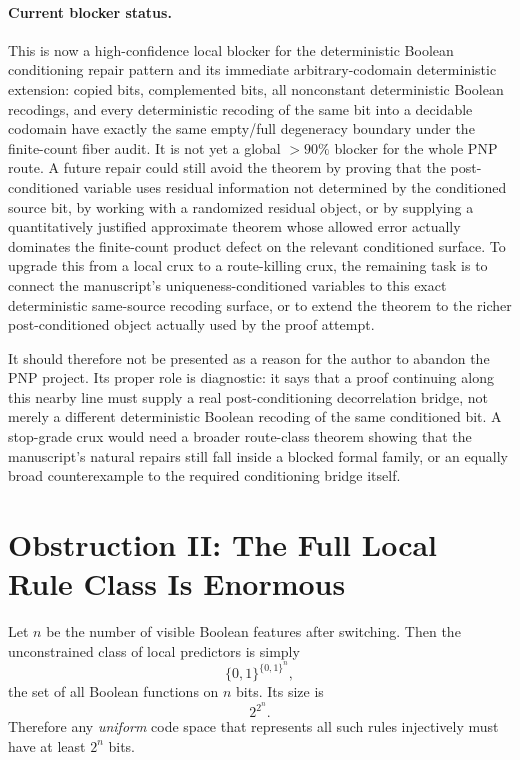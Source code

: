 \documentclass[11pt]{article}
\theoremstyle{remark}
\begin{document}
\paragraph{Current blocker status.}
This is now a high-confidence local blocker for the deterministic Boolean
conditioning repair pattern and its immediate arbitrary-codomain deterministic
extension: copied bits, complemented bits, all nonconstant deterministic Boolean
recodings, and every deterministic recoding of the same bit into a decidable
codomain have exactly the same empty/full degeneracy boundary under the
finite-count fiber audit.  It is not yet a global \(>90\%\) blocker for the
whole PNP route.  A future repair could still avoid the theorem by proving that
the post-conditioned variable uses residual information not determined by the
conditioned source bit, by working with a randomized residual object, or by
supplying a quantitatively justified approximate theorem whose allowed error
actually dominates the finite-count product defect on the relevant conditioned
surface.
To upgrade this from a local crux to a route-killing crux, the remaining task is
to connect the manuscript's uniqueness-conditioned variables to this exact
deterministic same-source recoding surface, or to extend the theorem to the
richer post-conditioned object actually used by the proof attempt.

It should therefore not be presented as a reason for the author to abandon the
PNP project.  Its proper role is diagnostic: it says that a proof continuing
along this nearby line must supply a real post-conditioning decorrelation
bridge, not merely a different deterministic Boolean recoding of the same
conditioned bit.  A stop-grade crux would need a broader route-class theorem
showing that the manuscript's natural repairs still fall inside a blocked
formal family, or an equally broad counterexample to the required conditioning
bridge itself.

\section{Obstruction II: The Full Local Rule Class Is Enormous}

Let $n$ be the number of visible Boolean features after switching.  Then the unconstrained class of
local predictors is simply
\[
  \{0,1\}^{\{0,1\}^n},
\]
the set of all Boolean functions on $n$ bits.  Its size is
\[
  2^{2^n}.
\]
Therefore any \emph{uniform} code space that represents all such rules injectively must have at
least $2^n$ bits.
\end{document}
